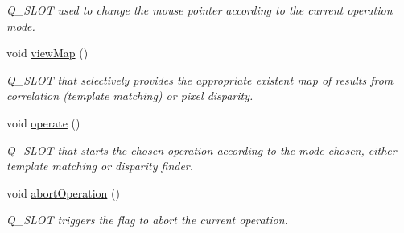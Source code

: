 \begin{CompactItemize}
\begin{CompactList}\small\item\em Q\_\-SLOT used to change the mouse pointer according to the current operation mode. \item\end{CompactList}\item 
\hypertarget{classQcorr_3275244fd6183a4fef92b85578fea864}{
void \hyperlink{classQcorr_3275244fd6183a4fef92b85578fea864}{viewMap} ()}
\label{classQcorr_3275244fd6183a4fef92b85578fea864}

\begin{CompactList}\small\item\em Q\_\-SLOT that selectively provides the appropriate existent map of results from correlation (template matching) or pixel disparity. \item\end{CompactList}\item 
\hypertarget{classQcorr_f71bf39d4955ab90b859e8137b6e0761}{
void \hyperlink{classQcorr_f71bf39d4955ab90b859e8137b6e0761}{operate} ()}
\label{classQcorr_f71bf39d4955ab90b859e8137b6e0761}

\begin{CompactList}\small\item\em Q\_\-SLOT that starts the chosen operation according to the mode chosen, either template matching or disparity finder. \item\end{CompactList}\item 
\hypertarget{classQcorr_d6e0fb9461faffd01afbf62e1a0be4c3}{
void \hyperlink{classQcorr_d6e0fb9461faffd01afbf62e1a0be4c3}{abortOperation} ()}
\label{classQcorr_d6e0fb9461faffd01afbf62e1a0be4c3}

\begin{CompactList}\small\item\em Q\_\-SLOT triggers the flag to abort the current operation. \item\end{CompactList}\end{CompactItemize}
